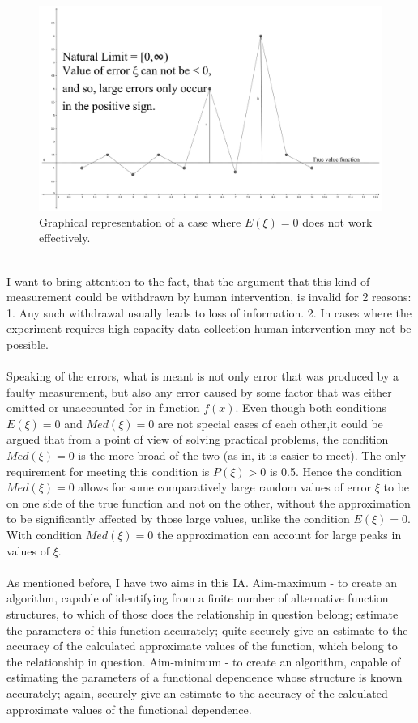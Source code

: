\documentclass[a4paper]{article}
\numberwithin{equation}{subsection}
\begin{document}
\begin{figure}[h!]
\includegraphics[scale=0.07]{natural_limits}
\centering
\caption{Graphical representation of a case where $E(\xi)=0$ does not work effectively.}
\label{fig:graph-nl}
\end{figure}
\\
I want to bring attention to the fact, that the argument that this kind of measurement could be withdrawn by human intervention, is invalid for 2 reasons: 1. Any such withdrawal usually leads to loss of information. 2. In cases where the experiment requires high-capacity data collection human intervention may not be possible.\\
\\
Speaking of the errors, what is meant is not only error that was produced by a faulty measurement, but also any error caused by some factor that was either omitted or unaccounted for in function $f(x)$. Even though both conditions $E(\xi)=0$ and $Med(\xi)=0$ are not special cases of each other,it could be argued that from a point of view of solving practical problems, the condition $Med(\xi)=0$ is the more broad of the two (as in, it is easier to meet). The only requirement for meeting this condition is $P(\xi)>0$ is 0.5.  Hence the condition $Med(\xi)=0$ allows for some comparatively large random values of error $\xi$ to be on one side of the true function and not on the other, without the approximation to be significantly affected by those large values, unlike the condition $E(\xi)=0$. With condition $Med(\xi)=0$ the approximation can account for large peaks in values of $\xi$.\\
\\
As mentioned before, I have two aims in this IA. Aim-maximum - to create an algorithm, capable of identifying from a finite number of alternative function structures, to which of those does the relationship in question belong; estimate the parameters of this function accurately; quite securely give an estimate to the accuracy of the calculated approximate values of the function, which belong to the relationship in question. Aim-minimum - to create an algorithm, capable of estimating the parameters of a functional dependence whose structure is known accurately; again, securely give an estimate to the accuracy of the calculated approximate values of the functional dependence. \\
\end{document}

